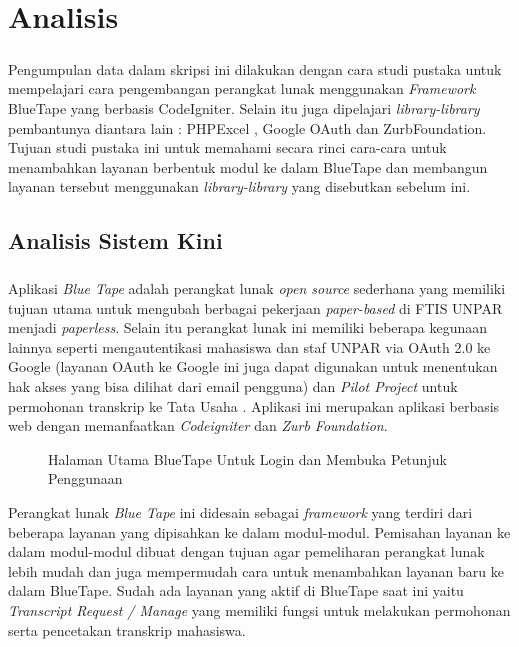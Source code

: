 \chapter{Analisis}
\label{chap:analisis}
\setcounter{secnumdepth}{3}

\paragraph{} Pengumpulan data dalam skripsi ini dilakukan dengan cara studi pustaka untuk mempelajari cara pengembangan perangkat lunak menggunakan \textit{Framework} BlueTape yang berbasis CodeIgniter. Selain itu juga dipelajari \textit{library-library} pembantunya diantara lain : PHPExcel , Google OAuth dan ZurbFoundation. Tujuan studi pustaka ini untuk memahami secara rinci cara-cara untuk menambahkan layanan berbentuk modul ke dalam BlueTape dan membangun layanan tersebut menggunakan \textit{library-library} yang disebutkan sebelum ini.

\section{Analisis Sistem Kini}
\paragraph{} Aplikasi \textit{Blue Tape} adalah perangkat lunak \textit{open source} sederhana yang memiliki tujuan utama untuk mengubah berbagai pekerjaan \textit{paper-based} di FTIS UNPAR menjadi \textit{paperless}. Selain itu perangkat lunak ini memiliki beberapa kegunaan lainnya seperti mengautentikasi mahasiswa dan staf UNPAR via OAuth 2.0 ke Google (layanan OAuth ke Google ini juga dapat digunakan untuk menentukan hak akses yang bisa dilihat dari email pengguna) dan \textit{Pilot Project} untuk permohonan transkrip ke Tata Usaha . Aplikasi ini merupakan aplikasi berbasis web dengan memanfaatkan \textit{Codeigniter} dan \textit{Zurb Foundation}. 
\newline
\begin{figure} [H]
	\centering  
	\caption[Halaman Utama BlueTape Untuk Login dan Membuka Petunjuk Penggunaan]{Halaman Utama BlueTape Untuk Login dan Membuka Petunjuk Penggunaan} 
	\label{fig:flow-chart-CodeIgniter} 
\end{figure}
Perangkat lunak \textit{Blue Tape} ini didesain sebagai \textit{framework} yang terdiri dari beberapa layanan yang dipisahkan ke dalam modul-modul. Pemisahan layanan ke dalam modul-modul dibuat dengan tujuan agar pemeliharan perangkat lunak lebih mudah dan juga mempermudah cara untuk menambahkan layanan baru ke dalam BlueTape. Sudah ada layanan yang aktif di BlueTape saat ini yaitu \textit{Transcript Request / Manage} yang memiliki fungsi untuk melakukan permohonan serta pencetakan transkrip mahasiswa.

